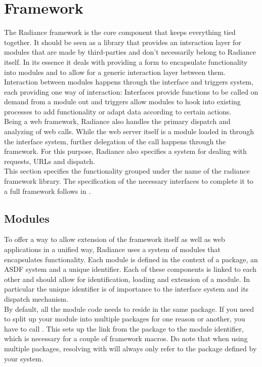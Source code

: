\chapter{Framework}\label{sec:framework}
The Radiance framework is the core component that keeps everything tied together. It should be seen as a library that provides an interaction layer for modules that are made by third-parties and don't necessarily belong to Radiance itself. In its essence it deals with providing a form to encapsulate functionality into modules and to allow for a generic interaction layer between them. \\

Interaction between modules happens through the interface and triggers system, each providing one way of interaction: Interfaces provide functions to be called on demand from a module out and triggers allow modules to hook into existing processes to add functionality or adapt data according to certain actions. \\

Being a web framework, Radiance also handles the primary dispatch and analyzing of web calls. While the web server itself is a module loaded in through the interface system, further delegation of the call happens through the framework. For this purpose, Radiance also specifies a system for dealing with requests, URLs and dispatch. \\

This section specifies the functionality grouped under the name of the radiance framework library. The specification of the necessary interfaces to complete it to a full framework follows in .

\section{Modules}\label{sec:modules}
To offer a way to allow extension of the framework itself as well as web applications in a unified way, Radiance uses a system of modules that encapsulates functionality. Each module is defined in the context of a package, an ASDF system and a unique identifier. Each of these components is linked to each other and should allow for identification, loading and extension of a module. In particular the unique identifier is of importance to the interface system and its dispatch mechanism. \\

By default, all the module code needs to reside in the same package. If you need to split up your module into multiple packages for one reason or another, you have to call . This sets up the link from the package to the module identifier, which is necessary for a couple of framework macros. Do note that when using multiple packages, resolving with  will always only refer to the package defined by your system. 

